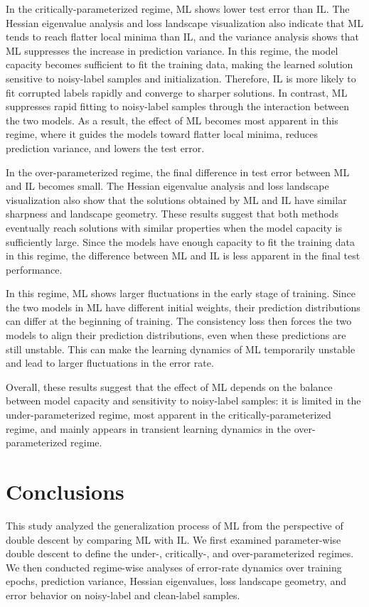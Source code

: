 \documentclass[dvipdfmx]{nolta}
\begin{document}
In the critically-parameterized regime, ML shows lower test error than IL. The Hessian eigenvalue analysis and loss landscape visualization also indicate that ML tends to reach flatter local minima than IL, and the variance analysis shows that ML suppresses the increase in prediction variance. In this regime, the model capacity becomes sufficient to fit the training data, making the learned solution sensitive to noisy-label samples and initialization. Therefore, IL is more likely to fit corrupted labels rapidly and converge to sharper solutions. In contrast, ML suppresses rapid fitting to noisy-label samples through the interaction between the two models. As a result, the effect of ML becomes most apparent in this regime, where it guides the models toward flatter local minima, reduces prediction variance, and lowers the test error.

In the over-parameterized regime, the final difference in test error between ML and IL becomes small. The Hessian eigenvalue analysis and loss landscape visualization also show that the solutions obtained by ML and IL have similar sharpness and landscape geometry. These results suggest that both methods eventually reach solutions with similar properties when the model capacity is sufficiently large. Since the models have enough capacity to fit the training data in this regime, the difference between ML and IL is less apparent in the final test performance.

In this regime, ML shows larger fluctuations in the early stage of training. Since the two models in ML have different initial weights, their prediction distributions can differ at the beginning of training. The consistency loss then forces the two models to align their prediction distributions, even when these predictions are still unstable. This can make the learning dynamics of ML temporarily unstable and lead to larger fluctuations in the error rate.

Overall, these results suggest that the effect of ML depends on the balance between model capacity and sensitivity to noisy-label samples: it is limited in the under-parameterized regime, most apparent in the critically-parameterized regime, and mainly appears in transient learning dynamics in the over-parameterized regime.

\section{Conclusions}

This study analyzed the generalization process of ML from the perspective of double descent by comparing ML with IL. We first examined parameter-wise double descent to define the under-, critically-, and over-parameterized regimes. We then conducted regime-wise analyses of error-rate dynamics over training epochs, prediction variance, Hessian eigenvalues, loss landscape geometry, and error behavior on noisy-label and clean-label samples.
\end{document}
